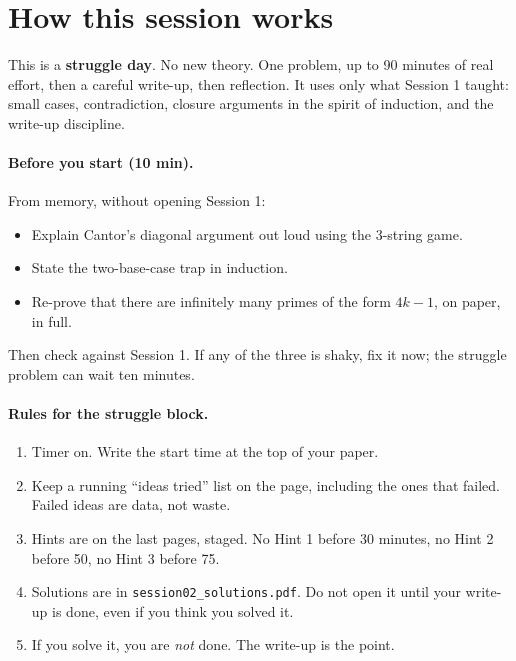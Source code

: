 \documentclass[11pt]{article}
\begin{document}

\section*{How this session works}

This is a \textbf{struggle day}. No new theory. One problem, up to 90 minutes of real effort, then a careful write-up, then reflection. It uses only what Session 1 taught: small cases, contradiction, closure arguments in the spirit of induction, and the write-up discipline.

\paragraph{Before you start (10 min).} From memory, without opening Session 1:
\begin{itemize}
  \item Explain Cantor's diagonal argument out loud using the 3-string game.
  \item State the two-base-case trap in induction.
  \item Re-prove that there are infinitely many primes of the form $4k-1$, on paper, in full.
\end{itemize}
Then check against Session 1. If any of the three is shaky, fix it now; the struggle problem can wait ten minutes.

\paragraph{Rules for the struggle block.}
\begin{enumerate}
  \item Timer on. Write the start time at the top of your paper.
  \item Keep a running ``ideas tried'' list on the page, including the ones that failed. Failed ideas are data, not waste.
  \item Hints are on the last pages, staged. No Hint 1 before 30 minutes, no Hint 2 before 50, no Hint 3 before 75.
  \item Solutions are in \texttt{session02\_solutions.pdf}. Do not open it until your write-up is done, even if you think you solved it.
  \item If you solve it, you are \emph{not} done. The write-up is the point.
\end{enumerate}
\end{document}
